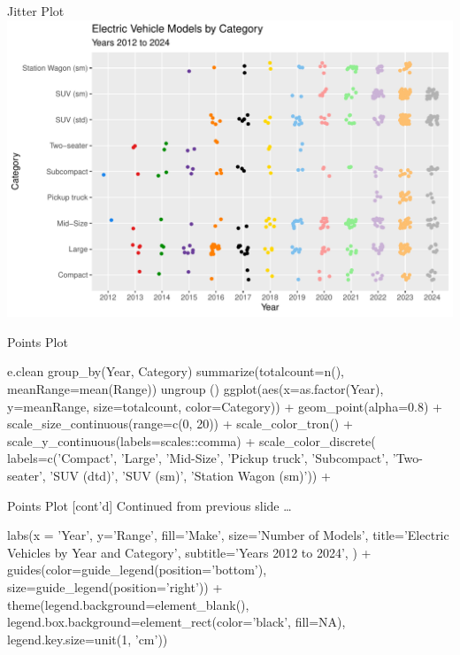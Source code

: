 \documentclass[ignorenonframetext,xcolor=x11names]{beamer}
\begin{document}
\begin{frame}{Jitter Plot}
  \includegraphics[width=\textwidth]{fuel.jitterdiscrete.pdf}
\end{frame}

\begin{frame}[fragile]{Points Plot}
\footnotesize
\begin{Rcode}
e.clean %
  group_by(Year, Category) %
  summarize(totalcount=n(), meanRange=mean(Range)) %
  ungroup () %
ggplot(aes(x=as.factor(Year), y=meanRange, 
           size=totalcount, color=Category)) +
  geom_point(alpha=0.8) +
  scale_size_continuous(range=c(0, 20)) +
  scale_color_tron() + 
  scale_y_continuous(labels=scales::comma) + 
  scale_color_discrete(
     labels=c('Compact', 'Large', 'Mid-Size', 
              'Pickup truck', 'Subcompact', 
              'Two-seater', 'SUV (dtd)', 
              'SUV (sm)', 'Station Wagon (sm)')) + 
\end{Rcode}
\end{frame}

\begin{frame}[fragile]{Points Plot \small [cont'd]}
Continued from previous slide \ldots
\footnotesize
\begin{Rcode}      
  labs(x = 'Year', y='Range', 
       fill='Make', size='Number of Models', 
       title='Electric Vehicles by Year and Category', 
       subtitle='Years 2012 to 2024', ) +
  guides(color=guide_legend(position='bottom'), 
         size=guide_legend(position='right')) +
  theme(legend.background=element_blank(), 
        legend.box.background=element_rect(color='black', 
                                           fill=NA),
        legend.key.size=unit(1, 'cm')) 
\end{Rcode}
\end{frame}
\end{document}
